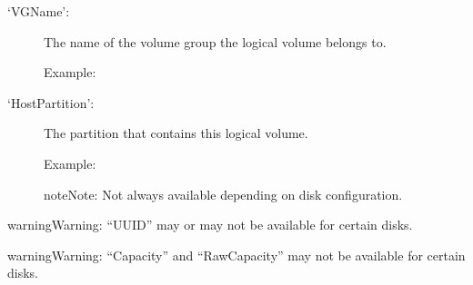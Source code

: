 \documentclass[letterpaper,10pt,english]{sphinxmanual}
\begin{document}
\begin{description}
\item[{‘VGName’:}] \leavevmode
The name of the volume group the logical volume belongs to.
\begin{description}
\item[{Example:}] \leavevmode
\begin{sphinxVerbatim}[commandchars=\\\{\}]
\PYG{p}{[}\PYG{p}{]}\PYG{p}{[}\PYG{p}{]}
\end{sphinxVerbatim}

\end{description}

\item[{‘HostPartition’:}] \leavevmode
The partition that contains this logical volume.
\begin{description}
\item[{Example:}] \leavevmode
\begin{sphinxVerbatim}[commandchars=\\\{\}]
\PYG{p}{[}\PYG{p}{]}\PYG{p}{[}\PYG{p}{]}
\end{sphinxVerbatim}

\end{description}

\begin{sphinxadmonition}{note}{Note:}
Not always available depending on disk configuration.
\end{sphinxadmonition}

\end{description}

\begin{sphinxadmonition}{warning}{Warning:}
“UUID” may or may not be available for certain disks.
\end{sphinxadmonition}

\begin{sphinxadmonition}{warning}{Warning:}
“Capacity” and “RawCapacity” may not be available for certain disks.
\end{sphinxadmonition}
\end{document}
